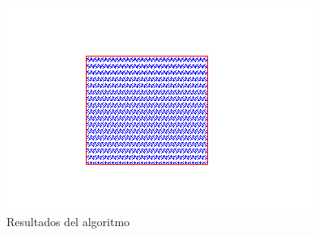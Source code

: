 \documentclass[a4paper,12pt]{article}
\begin{document}
\begin{figure}[H]
 \centering
 \includegraphics[scale = 0.5]{1.png}
 \caption{Resultados del algoritmo}
\end{figure}
\end{document}
